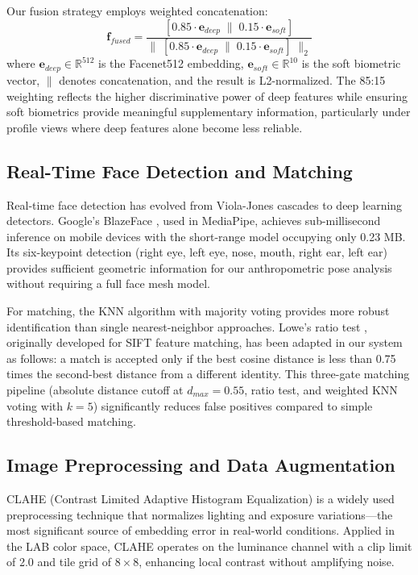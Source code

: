 \documentclass[conference]{IEEEtran}
\begin{document}
Our fusion strategy employs weighted concatenation:
\begin{equation}
\mathbf{f}_{fused} = \frac{[0.85 \cdot \mathbf{e}_{deep} \;\|\; 0.15 \cdot \mathbf{e}_{soft}]}{\|\;[0.85 \cdot \mathbf{e}_{deep} \;\|\; 0.15 \cdot \mathbf{e}_{soft}]\;\|_2}
\label{eq:fusion}
\end{equation}
where $\mathbf{e}_{deep} \in \mathbb{R}^{512}$ is the Facenet512 embedding, $\mathbf{e}_{soft} \in \mathbb{R}^{10}$ is the soft biometric vector, $\|$ denotes concatenation, and the result is L2-normalized. The 85:15 weighting reflects the higher discriminative power of deep features while ensuring soft biometrics provide meaningful supplementary information, particularly under profile views where deep features alone become less reliable.

\subsection{Real-Time Face Detection and Matching}

Real-time face detection has evolved from Viola-Jones cascades \cite{b22} to deep learning detectors. Google's BlazeFace \cite{b23}, used in MediaPipe, achieves sub-millisecond inference on mobile devices with the short-range model occupying only 0.23 MB. Its six-keypoint detection (right eye, left eye, nose, mouth, right ear, left ear) provides sufficient geometric information for our anthropometric pose analysis without requiring a full face mesh model.

For matching, the KNN algorithm with majority voting provides more robust identification than single nearest-neighbor approaches. Lowe's ratio test \cite{b24}, originally developed for SIFT feature matching, has been adapted in our system as follows: a match is accepted only if the best cosine distance is less than 0.75 times the second-best distance from a different identity. This three-gate matching pipeline (absolute distance cutoff at $d_{max} = 0.55$, ratio test, and weighted KNN voting with $k=5$) significantly reduces false positives compared to simple threshold-based matching.

\subsection{Image Preprocessing and Data Augmentation}

CLAHE (Contrast Limited Adaptive Histogram Equalization) \cite{b25} is a widely used preprocessing technique that normalizes lighting and exposure variations---the most significant source of embedding error in real-world conditions. Applied in the LAB color space, CLAHE operates on the luminance channel with a clip limit of 2.0 and tile grid of $8 \times 8$, enhancing local contrast without amplifying noise.
\end{document}
